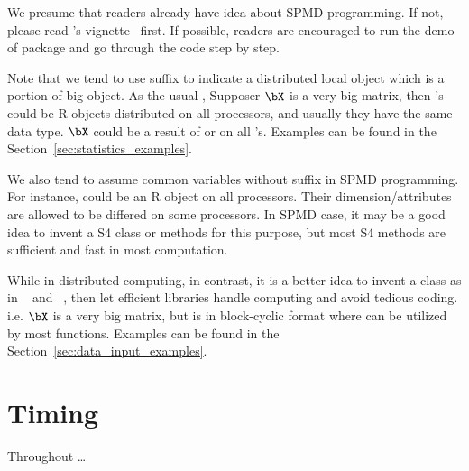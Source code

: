 We presume that readers already have idea about SPMD programming. If not,
please read 's vignette~\cite{Chen2012pbdMPIvignette} first.
If possible, readers are encouraged to run the demo of  package
and go through the code step by step.

Note that we tend to use suffix  to indicate a distributed
local object which is a portion of big object.
As the usual ,
Supposer $\bX$ is a very big matrix, then
's could be R objects distributed on all processors,
and usually they have the same data type.
$\bX$ could be a result of  or  on all
's.
Examples can be found in the Section~\ref{sec:statistics_examples}.

We also tend to assume common variables without suffix 
in SPMD programming.
For instance,  could be an R object on all processors.
Their dimension/attributes are allowed to be differed on some processors.
In SPMD case, it may be a good idea to invent a  S4 class
or methods for this purpose, but most S4 methods are sufficient
and fast in most computation.

While in distributed computing,
in contrast, it is a better idea to invent a  class as in
~\citep{Schmidt2012pbdBASEpackage} and
~\citep{Schmidt2012pbdDMATpackage}, then let efficient libraries
handle computing and avoid tedious coding.
i.e. $\bX$ is a very big matrix, but  is
in block-cyclic format where  can be utilized by most
 functions.
Examples can be found in the Section~\ref{sec:data_input_examples}.



\section{Timing}
\label{sec:introduction}

Throughout \dots
